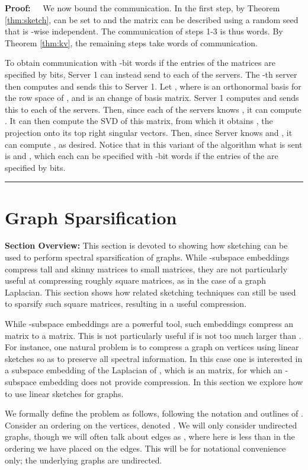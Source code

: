 \documentclass[11pt]{article}
\newenvironment{proof}{\begin{trivlist} \item {\bf Proof:~~}}
  {\qed\end{trivlist}}
\def\qed{\hfill\rule{2mm}{2mm}}
\begin{document}
\begin{proof}
We now bound the communication. In the first step, by Theorem \ref{thm:sketch},  can be set to 
and the matrix  can be described using a random seed that is -wise independent. The communication of
steps 1-3 is thus  words. By Theorem \ref{thm:kv}, the remaining steps take  words of communication.

To obtain communication with -bit words if the entries of the matrices  are specified by  bits, Server 1 can
instead send  to each of the servers. The -th server then computes  and sends this to Server 1.
Let , where  is an orthonormal
basis for the row space of , and  is an  change of basis matrix.
Server 1 computes 
 and sends this to each of the servers. Then, since each of the servers
knows , it can compute . 
It can then compute the SVD of this matrix, from which it obtains
, the projection onto its top  right singular vectors. Then, since Server  knows  and , it can compute
, as desired. Notice that in this variant of the algorithm what is sent is 
 and , which
each can be specified with -bit words if the entries of the  are specified by  bits.
\end{proof}

\section{Graph Sparsification}
{\bf Section Overview:} This section is devoted to showing how sketching can be used to perform spectral sparsification of graphs. While -subspace embeddings compress tall and skinny matrices to small matrices, they are not particularly useful at compressing roughly square matrices, as in the case of a graph Laplacian. This section shows how related sketching techniques can still be used to sparsify such square matrices, resulting in a useful compression.

While -subspace embeddings are a powerful tool, such embeddings compress an  
matrix to a  matrix. 
This is not particularly useful if  is not too much larger than . For instance, one natural problem is to compress
a graph  on  vertices using linear sketches so as to preserve all spectral information. In this case one is interested in a subspace embedding of the Laplacian of , which is an  matrix, for which an -subspace embedding does not provide compression.  
In this section we explore
how to use linear sketches for graphs. 

We formally define the problem as follows, following the notation and outlines of \cite{KLMMS14}. 
Consider an ordering on the  vertices, denoted . We will only
consider undirected graphs, though we will often talk about edges  as , where here  is less than
 in the ordering we have placed on the edges. This will be for notational convenience only; the underlying graphs are 
undirected. 
\end{document}
